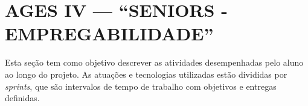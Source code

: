 \chapter[AGES IV --- “SENIORS - EMPREGABILIDADE”]{AGES IV --- “SENIORS - EMPREGABILIDADE”}

Esta seção tem como objetivo descrever as atividades desempenhadas pelo
aluno ao longo do projeto. As atuações e tecnologias utilizadas estão divididas por
\textit{sprints}, que são intervalos de tempo de trabalho com objetivos e entregas definidas.





